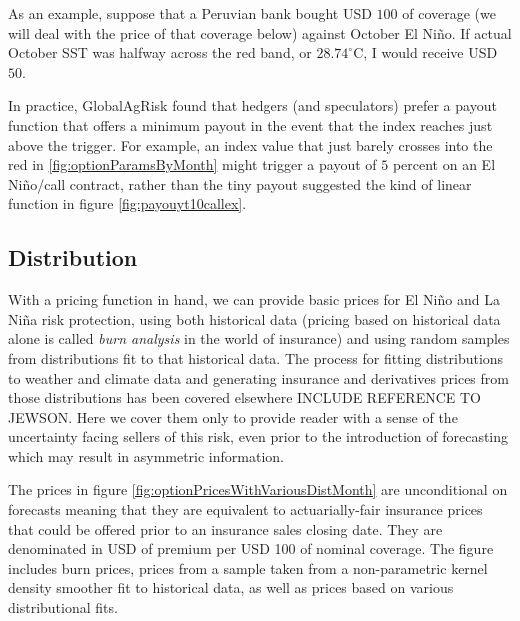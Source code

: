 \documentclass[authoryear]{article}
\begin{document}
As an example, suppose that a Peruvian bank bought USD $100$ of coverage (we will deal with the price of that coverage below) against October El Ni\~no. If actual October SST was halfway across the red band, or $28.74^{\circ}\mathrm{C}$, I would receive USD $50$.

In practice, GlobalAgRisk found that hedgers (and speculators) prefer a payout function that offers a minimum payout in the event that the index reaches just above the trigger. For example, an index value that just barely crosses into the red in \ref{fig:optionParamsByMonth} might trigger a payout of $5$ percent on an El Ni\~no/call contract, rather than the tiny payout suggested the kind of linear function in figure \ref{fig:payouyt10callex}.


\subsection{Distribution}
With a pricing function in hand, we can provide basic prices for El Ni\~no and La Ni\~na risk protection, using both historical data (pricing based on historical data alone is called \emph{burn analysis} in the world of insurance) and using random samples from distributions fit to that historical data. The process for fitting distributions to weather and climate data and generating insurance and derivatives prices from those distributions has been covered elsewhere INCLUDE REFERENCE TO JEWSON. Here we cover them only to provide reader with a sense of the uncertainty facing sellers of this risk, even prior to the introduction of forecasting which may result in asymmetric information. 

The prices in figure \ref{fig:optionPricesWithVariousDistMonth} are unconditional on forecasts meaning that they are equivalent to actuarially-fair insurance prices that could be offered prior to an insurance sales closing date. They are denominated in USD of premium per USD 100 of nominal coverage. The figure includes burn prices, prices from a sample taken from a non-parametric kernel density smoother fit to historical data, as well as prices based on various distributional fits. 
\end{document}
